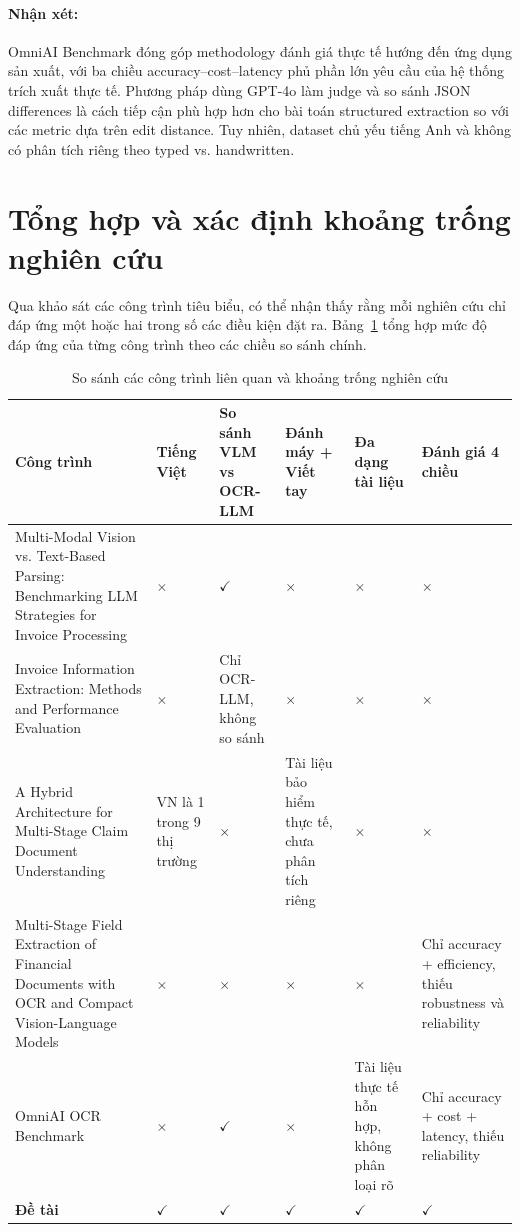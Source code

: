 ﻿\documentclass[12pt]{report}
\begin{document}
\paragraph{Nhận xét:}
OmniAI Benchmark đóng góp methodology đánh giá thực tế hướng đến ứng dụng sản xuất, với ba chiều accuracy--cost--latency phủ phần lớn yêu cầu của hệ thống trích xuất thực tế. Phương pháp dùng GPT-4o làm judge và so sánh JSON differences là cách tiếp cận phù hợp hơn cho bài toán structured extraction so với các metric dựa trên edit distance. Tuy nhiên, dataset chủ yếu tiếng Anh và không có phân tích riêng theo typed vs. handwritten.

\section{Tổng hợp và xác định khoảng trống nghiên cứu}\label{sec:research_gap}

Qua khảo sát các công trình tiêu biểu, có thể nhận thấy rằng mỗi nghiên cứu chỉ đáp ứng một hoặc hai trong số các điều kiện đặt ra. Bảng~\ref{tab:research_gap} tổng hợp mức độ đáp ứng của từng công trình theo các chiều so sánh chính.

\begin{table}[h]
\centering
\caption{So sánh các công trình liên quan và khoảng trống nghiên cứu}
\label{tab:research_gap}
\footnotesize
\renewcommand{\arraystretch}{1.3}
\begin{tabular}{|p{4cm}|p{1.7cm}|p{2.1cm}|p{2cm}|p{2.2cm}|p{2.4cm}|}
\hline
\textbf{Công trình} & \textbf{Tiếng Việt} & \textbf{So sánh VLM vs OCR-LLM} & \textbf{Đánh máy + Viết tay} & \textbf{Đa dạng tài liệu} & \textbf{Đánh giá 4 chiều} \\ \hline
Multi-Modal Vision vs. Text-Based Parsing: Benchmarking LLM Strategies for Invoice Processing & $\times$ & $\checkmark$ & $\times$ & $\times$ & $\times$ \\ \hline
Invoice Information Extraction: Methods and Performance Evaluation & $\times$ & Chỉ OCR-LLM, không so sánh & $\times$ & $\times$ & $\times$ \\ \hline
A Hybrid Architecture for Multi-Stage Claim Document Understanding & VN là 1 trong 9 thị trường & $\times$ & Tài liệu bảo hiểm thực tế, chưa phân tích riêng & $\times$ & $\times$ \\ \hline
Multi-Stage Field Extraction of Financial Documents with OCR and Compact Vision-Language Models & $\times$ & $\times$ & $\times$ & $\times$ & Chỉ accuracy + efficiency, thiếu robustness và reliability \\ \hline
OmniAI OCR Benchmark & $\times$ & $\checkmark$ & $\times$ & Tài liệu thực tế hỗn hợp, không phân loại rõ & Chỉ accuracy + cost + latency, thiếu reliability \\ \hline
\rowcolor{yellow!25}
\textbf{Đề tài} & \textbf{$\checkmark$} & \textbf{$\checkmark$} & \textbf{$\checkmark$} & \textbf{$\checkmark$} & \textbf{$\checkmark$} \\ \hline
\end{tabular}
\end{table}
\end{document}
